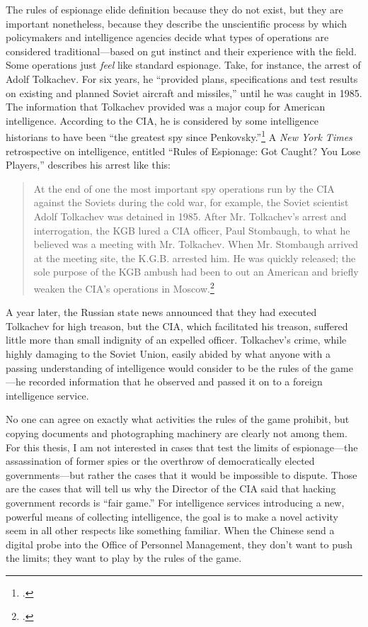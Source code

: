 \documentclass[11pt]{memoir}
\begin{document}
\begin{refsegment}
The rules of espionage elide definition because they do not exist, but they are important nonetheless, because they describe the unscientific process by which policymakers and intelligence agencies decide what types of operations are considered traditional---based on gut instinct and their experience with the field. Some operations just \emph{feel} like standard espionage. Take, for instance, the arrest of Adolf Tolkachev.  For six years, he ``provided plans, specifications and test results on existing and planned Soviet aircraft and missiles,'' until he was caught in 1985. The information that Tolkachev provided was a major coup for American intelligence. According to the CIA, he is considered by some intelligence historians to have been ``the greatest spy since Penkovsky.''\footcite{cia_look_2008} A \emph{New York Times} retrospective on intelligence, entitled ``Rules of Espionage: Got Caught? You Lose Players,'' describes his arrest like this:

\begin{quote}
At the end of one the most important spy operations run by the CIA against the Soviets during the cold war, for example, the Soviet scientist Adolf Tolkachev was detained in 1985. After Mr. Tolkachev's arrest and interrogation, the KGB lured a CIA officer, Paul Stombaugh, to what he believed was a meeting with Mr. Tolkachev. When Mr. Stombaugh arrived at the meeting site, the K.G.B. arrested him. He was quickly released; the sole purpose of the KGB ambush had been to out an American and briefly weaken the CIA's operations in Moscow.\footcite{risen_rules_2001}
\end{quote}
A year later, the Russian state news announced that they had executed Tolkachev for high treason, but the CIA, which facilitated his treason, suffered little more than small indignity of an expelled officer. Tolkachev's crime, while highly damaging to the Soviet Union, easily abided by what anyone with a passing understanding of intelligence would consider to be the rules of the game---he recorded information that he observed and passed it on to a foreign intelligence service.

No one can agree on exactly what activities the rules of the game prohibit, but copying documents and photographing machinery are clearly not among them. For this thesis, I am not interested in cases that test the limits of espionage---the assassination of former spies or the overthrow of democratically elected governments---but rather the cases that it would be impossible to dispute. Those are the cases that will tell us why the Director of the CIA said that hacking government records is ``fair game.'' For intelligence services introducing a new, powerful means of collecting intelligence, the goal is to make a novel activity seem in all other respects like something familiar. When the Chinese send a digital probe into the Office of Personnel Management, they don't want to push the limits; they want to play by the rules of the game.


\end{refsegment}
\end{document}
